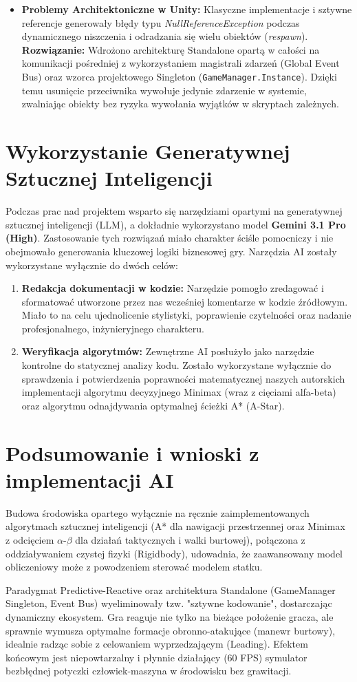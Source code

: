 \documentclass[12pt, a4paper]{article}
\begin{document}
\begin{itemize}
    \item \textbf{Problemy Architektoniczne w Unity:} Klasyczne implementacje i sztywne referencje generowały błędy typu \textit{NullReferenceException} podczas dynamicznego niszczenia i odradzania się wielu obiektów (\textit{respawn}). \textbf{Rozwiązanie:} Wdrożono architekturę Standalone opartą w całości na komunikacji pośredniej z wykorzystaniem magistrali zdarzeń (Global Event Bus) oraz wzorca projektowego Singleton (\texttt{GameManager.Instance}). Dzięki temu usunięcie przeciwnika wywołuje jedynie zdarzenie w systemie, zwalniając obiekty bez ryzyka wywołania wyjątków w skryptach zależnych.
\end{itemize}

\section{Wykorzystanie Generatywnej Sztucznej Inteligencji}
Podczas prac nad projektem wsparto się narzędziami opartymi na generatywnej sztucznej inteligencji (LLM), a dokładnie wykorzystano model \textbf{Gemini 3.1 Pro (High)}. Zastosowanie tych rozwiązań miało charakter ściśle pomocniczy i nie obejmowało generowania kluczowej logiki biznesowej gry. Narzędzia AI zostały wykorzystane wyłącznie do dwóch celów:

\begin{enumerate}
    \item \textbf{Redakcja dokumentacji w kodzie:} Narzędzie pomogło zredagować i sformatować utworzone przez nas wcześniej komentarze w kodzie źródłowym. Miało to na celu ujednolicenie stylistyki, poprawienie czytelności oraz nadanie profesjonalnego, inżynieryjnego charakteru.
    \item \textbf{Weryfikacja algorytmów:} Zewnętrzne AI posłużyło jako narzędzie kontrolne do statycznej analizy kodu. Zostało wykorzystane wyłącznie do sprawdzenia i potwierdzenia poprawności matematycznej naszych autorskich implementacji algorytmu decyzyjnego Minimax (wraz z cięciami alfa-beta) oraz algorytmu odnajdywania optymalnej ścieżki A* (A-Star).
\end{enumerate}

\section{Podsumowanie i wnioski z implementacji AI}
Budowa środowiska opartego wyłącznie na ręcznie zaimplementowanych algorytmach sztucznej inteligencji (A* dla nawigacji przestrzennej oraz Minimax z odcięciem $\alpha$-$\beta$ dla działań taktycznych i walki burtowej), połączona z oddziaływaniem czystej fizyki (Rigidbody), udowadnia, że zaawansowany model obliczeniowy może z powodzeniem sterować modelem statku. 

Paradygmat Predictive-Reactive oraz architektura Standalone (GameManager Singleton, Event Bus) wyeliminowały tzw. "sztywne kodowanie", dostarczając dynamiczny ekosystem. Gra reaguje nie tylko na bieżące położenie gracza, ale sprawnie wymusza optymalne formacje obronno-atakujące (manewr burtowy), idealnie radząc sobie z celowaniem wyprzedzającym (Leading). Efektem końcowym jest niepowtarzalny i płynnie działający (60 FPS) symulator bezbłędnej potyczki człowiek-maszyna w środowisku bez grawitacji.
\end{document}
